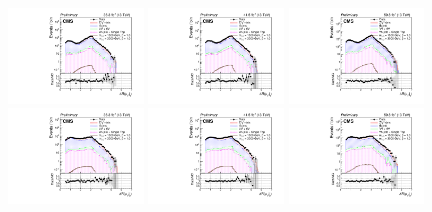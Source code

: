 \begin{figure}[H]
       \centering
       {\includegraphics[width=0.32\textwidth]{Images/Analysis/Results_2016_Unblinded/Plots/Preselection/BasicLQ_uujj_DR_muon1jet1_standard.pdf}}
       {\includegraphics[width=0.32\textwidth]{Images/Analysis/Results_2017_Unblinded/Plots/Preselection/BasicLQ_uujj_DR_muon1jet1_standard.pdf}}
       {\includegraphics[width=0.32\textwidth]{Images/Analysis/Results_2018_Unblinded/Plots/Preselection/BasicLQ_uujj_DR_muon1jet1_standard.pdf}}
       {\includegraphics[width=0.32\textwidth]{Images/Analysis/Results_2016_Unblinded/Plots/Preselection/BasicLQ_uujj_DR_muon1jet2_standard.pdf}}
       {\includegraphics[width=0.32\textwidth]{Images/Analysis/Results_2017_Unblinded/Plots/Preselection/BasicLQ_uujj_DR_muon1jet2_standard.pdf}}
       {\includegraphics[width=0.32\textwidth]{Images/Analysis/Results_2018_Unblinded/Plots/Preselection/BasicLQ_uujj_DR_muon1jet2_standard.pdf}}

\end{figure}
